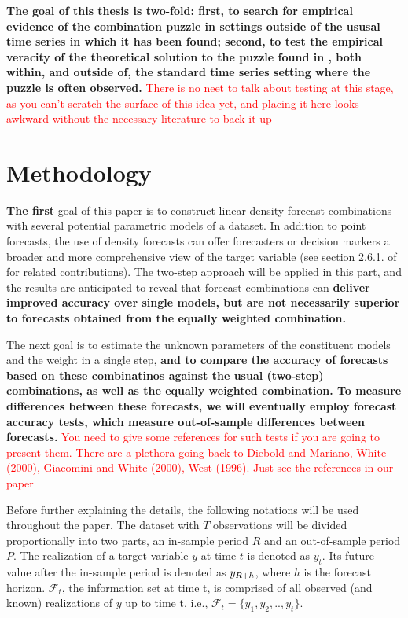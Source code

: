 \documentclass{monashthesis}
\begin{document}
\textbf{The goal of this thesis is two-fold: first, to search for empirical evidence of the combination puzzle in settings outside of the ususal time series in which it has been found; second, to test the empirical veracity of the theoretical solution to the puzzle found in \textcite{FZMP23}, both within, and outside of, the standard time series setting where the puzzle is often observed.}
\textcolor{red}{There is no neet to talk about testing at this stage, as you can't scratch the surface of this idea yet, and placing it here looks awkward without the necessary literature to back it up}

\hypertarget{methodology}{%
\chapter{Methodology}\label{methodology}}

\textbf{The first} goal of this paper is to construct linear density forecast combinations with several potential parametric models of a dataset. In addition to point forecasts, the use of density forecasts can offer forecasters or decision markers a broader and more comprehensive view of the target variable (see section 2.6.1. of \textcite{FTP22} for related contributions). The two-step approach will be applied in this part, and the results are anticipated to reveal that forecast combinations can \textbf{deliver improved accuracy over single models, but are not necessarily superior to forecasts obtained from the equally weighted combination.}

The next goal is to estimate the unknown parameters of the constituent models and the weight in a single step, \textbf{and to compare the accuracy of forecasts based on these combinatinos against the usual (two-step) combinations, as well as the equally weighted combination. To measure differences between these forecasts, we will eventually employ forecast accuracy tests, which measure out-of-sample differences between forecasts.}
\textcolor{red}{You need to give some references for such tests if you are going to present them. There are a plethora going back to Diebold and Mariano, White (2000), Giacomini and White (2000), West (1996). Just see the references in our paper}

Before further explaining the details, the following notations will be used throughout the paper. The dataset with \(T\) observations will be divided proportionally into two parts, an in-sample period \(R\) and an out-of-sample period \(P\). The realization of a target variable \(y\) at time \(t\) is denoted as \(y_{t}\). Its future value after the in-sample period is denoted as \(y_{\small{R+h}}\), where \(h\) is the forecast horizon. \(\mathcal{F}_t\), the information set at time t, is comprised of all observed (and known) realizations of \(y\) up to time t, i.e., \(\mathcal{F}_t = \{y_1, y_2, .., y_t\}\).
\end{document}
